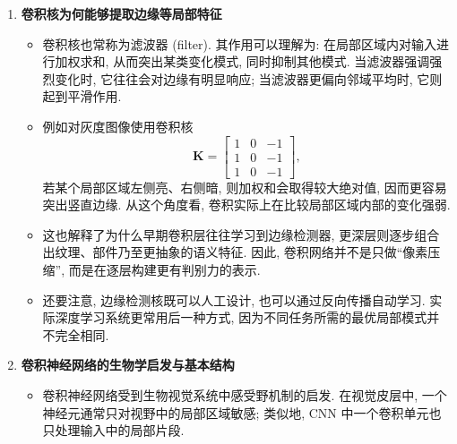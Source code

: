 \documentclass{../nndlcourse}
\begin{document}
\begin{enumerate}
\begin{itemize}
        当 $K = 3$ 时, 每个卷积核在每个输入通道上只含 $9$ 个权重, 这与全连接层中依赖整幅图像大小的参数量形成鲜明对比.
        \item 进一步地, 同一个卷积核会在整张图像上滑动并重复使用, 这就是权重共享. 它意味着“同一种局部模式”无论出现在左上角还是右下角, 都可以由同一组参数来检测. 因此, 参数减少并不是以牺牲结构信息为代价换来的, 反而正好利用了图像中的空间重复性.
        \item 需要注意的是, 深度学习实现中常说的“卷积”多数实际计算的是互相关 (cross-correlation), 即不对卷积核做翻转. 由于卷积核参数本身是可学习的, 这一差异通常不会影响模型表达能力, 因而工程上仍沿用“卷积”这一名称.
    \end{itemize}
    \item \textbf{卷积核为何能够提取边缘等局部特征}
    \begin{itemize}
        \item 卷积核也常称为滤波器 (filter). 其作用可以理解为: 在局部区域内对输入进行加权求和, 从而突出某类变化模式, 同时抑制其他模式. 当滤波器强调强烈变化时, 它往往会对边缘有明显响应; 当滤波器更偏向邻域平均时, 它则起到平滑作用.
        \item 例如对灰度图像使用卷积核
        \begin{equation*}
            \boldsymbol{K} =
            \begin{bmatrix}
                1 & 0 & -1 \\
                1 & 0 & -1 \\
                1 & 0 & -1
            \end{bmatrix},
        \end{equation*}
        若某个局部区域左侧亮、右侧暗, 则加权和会取得较大绝对值, 因而更容易突出竖直边缘. 从这个角度看, 卷积实际上在比较局部区域内部的变化强弱.
        \item 这也解释了为什么早期卷积层往往学习到边缘检测器, 更深层则逐步组合出纹理、部件乃至更抽象的语义特征. 因此, 卷积网络并不是只做“像素压缩”, 而是在逐层构建更有判别力的表示.
        \item 还要注意, 边缘检测核既可以人工设计, 也可以通过反向传播自动学习. 实际深度学习系统更常用后一种方式, 因为不同任务所需的最优局部模式并不完全相同.
    \end{itemize}
    \item \textbf{卷积神经网络的生物学启发与基本结构}
    \begin{itemize}
        \item 卷积神经网络受到生物视觉系统中感受野机制的启发. 在视觉皮层中, 一个神经元通常只对视野中的局部区域敏感; 类似地, CNN 中一个卷积单元也只处理输入中的局部片段.

\end{itemize}
\end{enumerate}
\end{document}
